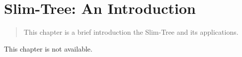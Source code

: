 \chapter{Slim-Tree: An Introduction}

\begin{quote}
  This chapter is a brief introduction the Slim-Tree and its applications.
\end{quote}

This chapter is not available.